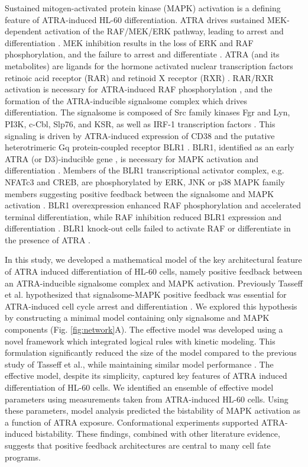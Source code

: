 \documentclass[10pt,twocolumn,twoside,final]{IEEEtran}
\begin{document}
Sustained mitogen-activated protein kinase (MAPK) activation is a defining feature of ATRA-induced HL-60 differentiation.
ATRA drives sustained MEK-dependent activation of the RAF/MEK/ERK pathway, leading to arrest and differentiation \cite{Yen1998}.
MEK inhibition results in the loss of ERK and RAF phosphorylation, and the failure to arrest and differentiate \cite{Hong2001}.
ATRA (and its metabolites) are ligands for the hormone activated nuclear transcription factors retinoic acid receptor (RAR) and retinoid X receptor (RXR) \cite{Mangelsdorf1990}.
RAR/RXR activation is necessary for ATRA-induced RAF phosphorylation  \cite{Hong2001},
and the formation of the ATRA-inducible signalsome complex which drives differentiation.
The signalsome is composed of Src family kinases Fgr and Lyn, PI3K, c-Cbl, Slp76, and KSR, as well as IRF-1 transcription factors \cite{Congleton:2012fk,Shen:2011aa,Shen2009,Yen2006,Marchisio:1998aa}.
This signaling is driven by ATRA-induced expression of CD38 and the putative heterotrimeric Gq protein-coupled receptor BLR1 \cite{Congleton2011,WANG2004}.
BLR1, identified as an early ATRA (or D3)-inducible gene \cite{YEN1990},
is necessary for MAPK activation and differentiation \cite{WANG2004}.
Members of the BLR1 transcriptional activator complex, e.g. NFATc3 and CREB,
are phosphorylated by ERK, JNK or p38 MAPK family members suggesting positive feedback between the signalsome and MAPK activation \cite{Yang2002}.
BLR1 overexpression enhanced RAF phosphorylation and accelerated terminal differentiation, while RAF inhibition reduced BLR1 expression and differentiation \cite{Wang2008}.
BLR1 knock-out cells failed to activate RAF or differentiate in the presence of ATRA \cite{Wang2008}.

In this study, we developed a mathematical model of the key architectural feature of ATRA induced differentiation of HL-60 cells,
namely positive feedback between an ATRA-inducible signalsome complex and MAPK activation.
Previously Tasseff et al. hypothesized that signalsome-MAPK positive feedback was essential for ATRA-induced
cell cycle arrest and differentiation \cite{Tasseff2011}.
We explored this hypothesis by constructing a minimal model containing only signalsome and MAPK components (Fig. \ref{fig:network}A).
The effective model was developed using a novel framework which integrated logical rules with kinetic modeling.
This formulation significantly reduced the size of the model compared to the previous study of Tasseff et al., while maintaining similar model performance \cite{Tasseff2011}.
The effective model, despite its simplicity, captured key features of ATRA induced differentiation of HL-60 cells.
We identified an ensemble of effective model parameters using measurements taken from ATRA-induced HL-60 cells.
Using these parameters, model analysis predicted the bistability of MAPK activation as a function of ATRA exposure.
Conformational experiments supported ATRA-induced bistability.
These findings, combined with other literature evidence, suggests that positive feedback architectures are central to
many cell fate programs.
\end{document}
